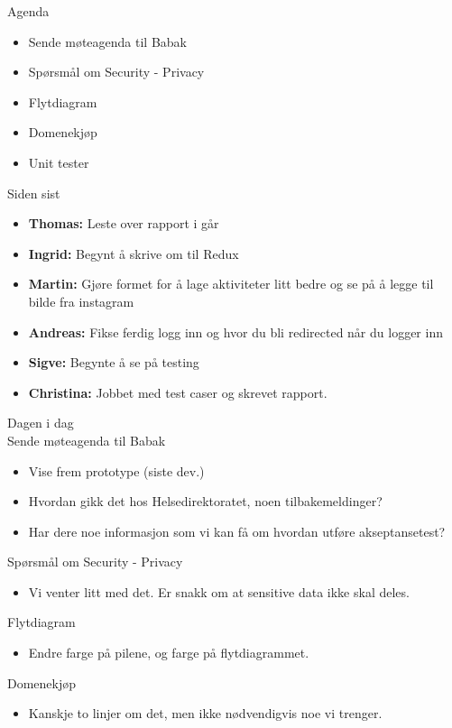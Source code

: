 {\Large{Agenda}}
\begin{itemize} 
    \item Sende møteagenda til Babak
    \item Spørsmål om Security - Privacy
    \item Flytdiagram
    \item Domenekjøp
    \item Unit tester
\end{itemize}


{\Large{Siden sist}}
\begin{itemize}  
    \item \textbf{Thomas:} Leste over rapport i går
    \item \textbf{Ingrid:} Begynt å skrive om til Redux
    \item \textbf{Martin:} Gjøre formet for å lage aktiviteter litt bedre og se på å legge til bilde fra instagram
    \item \textbf{Andreas:} Fikse ferdig logg inn og hvor du bli redirected når du logger inn
    \item \textbf{Sigve:} Begynte å se på testing
    \item \textbf{Christina:} Jobbet med test caser og skrevet rapport.
\end{itemize}


{\Large{Dagen i dag}}\\
{\large{Sende møteagenda til Babak}}
\begin{itemize}  
    \item Vise frem prototype (siste dev.)
    \item Hvordan gikk det hos Helsedirektoratet, noen tilbakemeldinger?
    \item Har dere noe informasjon som vi kan få om hvordan utføre akseptansetest?
\end{itemize}

{\large{Spørsmål om Security - Privacy}}
\begin{itemize}  
    \item Vi venter litt med det. Er snakk om at sensitive data ikke skal deles.
\end{itemize}

{\large{Flytdiagram}}
\begin{itemize}  
    \item Endre farge på pilene, og farge på flytdiagrammet.
\end{itemize}

{\large{Domenekjøp}}
\begin{itemize}  
    \item Kanskje to linjer om det, men ikke nødvendigvis noe vi trenger.
\end{itemize}

